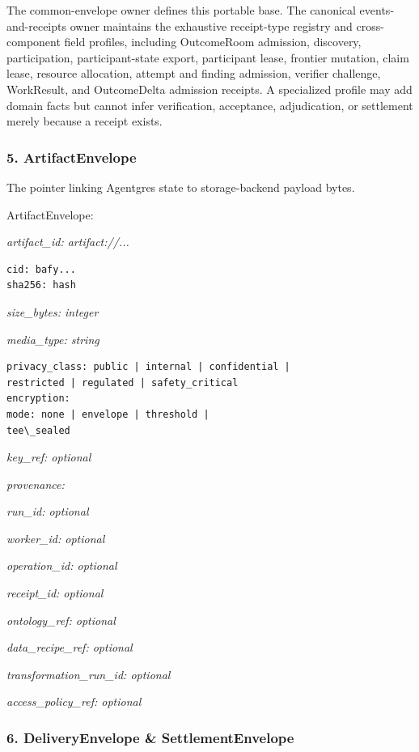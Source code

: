 \documentclass[
  11pt,
]{article}
\begin{document}
The common-envelope owner defines this portable base. The canonical
events-and-receipts owner maintains the exhaustive receipt-type registry and
cross-component field profiles, including OutcomeRoom admission, discovery,
participation, participant-state export, participant lease, frontier mutation,
claim lease, resource allocation, attempt and finding admission, verifier
challenge, WorkResult, and OutcomeDelta admission receipts. A specialized
profile may add domain facts but cannot infer verification, acceptance,
adjudication, or settlement merely because a receipt exists.

\hypertarget{artifactenvelope}{%
\subsubsection{5. ArtifactEnvelope}\label{artifactenvelope}}

The pointer linking Agentgres state to storage-backend payload bytes.

ArtifactEnvelope:

\emph{artifact\_id: artifact://...}

\begin{lstlisting}[language=rustioi]
cid: bafy...
sha256: hash
\end{lstlisting}
\emph{size\_bytes: integer}

\emph{media\_type: string}

\begin{lstlisting}[language={},basicstyle=\ttfamily\scriptsize]
privacy_class: public | internal | confidential |
restricted | regulated | safety_critical
encryption:
mode: none | envelope | threshold |
tee\_sealed
\end{lstlisting}

\emph{key\_ref: optional}

\emph{provenance:}

\emph{run\_id: optional}

\emph{worker\_id: optional}

\emph{operation\_id: optional}

\emph{receipt\_id: optional}

\emph{ontology\_ref: optional}

\emph{data\_recipe\_ref: optional}

\emph{transformation\_run\_id: optional}

\emph{access\_policy\_ref: optional}

\hypertarget{deliveryenvelope-settlementenvelope}{%
\subsubsection{6. DeliveryEnvelope \&
SettlementEnvelope}\label{deliveryenvelope-settlementenvelope}}
\end{document}
